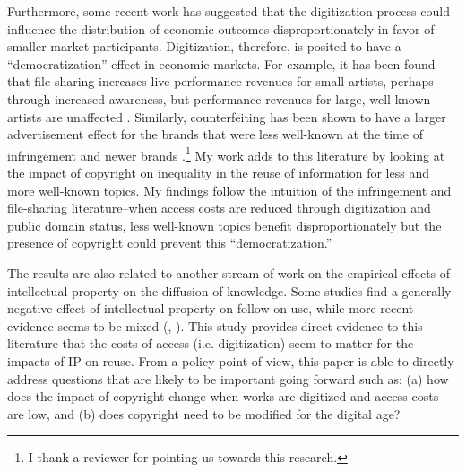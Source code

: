 \documentclass[11pt]{article}
\begin{document}
Furthermore, some recent work has suggested that the digitization process could influence the distribution of economic outcomes disproportionately in favor of smaller market participants. Digitization, therefore, is posited to have a ``democratization'' effect in economic markets. For example, it has been found that file-sharing increases live performance revenues for small artists, perhaps through increased awareness, but performance revenues for large, well-known artists are unaffected \citep{mortimer_supply_2012}. Similarly, counterfeiting has been shown to have a larger advertisement effect for the brands that were less well-known at the time of infringement and newer brands \citep{qian_counterfeiters:_2014}.\footnote{I thank a reviewer for pointing us towards this research.} My work adds to this literature by looking at the impact of copyright on inequality in the reuse of information for less and more well-known topics. My findings follow the intuition of the infringement and file-sharing literature--when access costs are reduced through digitization and public domain status, less well-known topics benefit disproportionately but the presence of copyright could prevent this ``democratization.''


The results are also related to another stream of work on the empirical effects of intellectual property on the diffusion of knowledge. Some studies \citep{murray_formal_2007, murray_mice_2009, williams_intellectual_2013, furman_climbing_2011} find a generally negative effect of intellectual property on follow-on use, while more recent evidence seems to be mixed (\cite{sampat_how_2014}, \cite{galasso_patents_2015}). This study provides direct evidence to this literature that the costs of access (i.e. digitization) seem to matter for the impacts of IP on reuse. From a policy point of view, this paper is able to directly address questions that are likely to be important going forward such as: (a) how does the impact of copyright change when works are digitized and access costs are low, and (b) does copyright need to be modified for the digital age?
\end{document}
